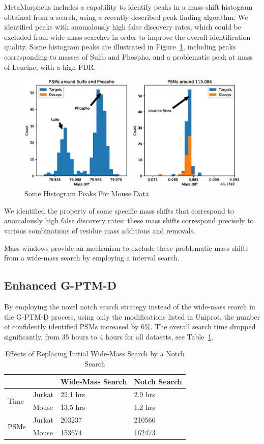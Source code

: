 \documentclass[journal=jprobs,manuscript=article]{achemso}
\begin{document}
MetaMorpheus includes a capability to identify peaks in a mass shift histogram obtained from a search, using a recently described peak finding algorithm\cite{Rodriguez_2014}.
We identified peaks with anomalously high false discovery rates, which could be excluded from wide mass searches in order to improve the overall identification quality.
Some histogram peaks are illustrated in Figure~\ref{fig:figure3}, including peaks corresponding to masses of Sulfo and Phospho, and a problematic peak at mass of Leucine, with a high FDR.

\begin{figure}
\caption{Some Histogram Peaks For Mouse Data}
\label{fig:figure3}
\includegraphics[scale=0.6]{figure_3peaks}
\end{figure}

We identified the property of some specific mass shifts that correspond to anomalously high false discovery rates: these mass shifts correspond precisely to various combinations of residue mass additions and removals.

Mass windows provide an mechanism to exclude these problematic mass shifts from a wide-mass search by employing a interval search.

\subsection{Enhanced G-PTM-D}

By employing the novel notch search strategy instead of the wide-mass search in the G-PTM-D process, using only the modifications listed in Uniprot, the number of confidently identified PSMs increased by 6\%.
The overall search time dropped significantly, from 35 hours to 4 hours for all datasets, see Table~\ref{my-label}.

\begin{table}[]
\centering
\caption{Effects of Replacing Initial Wide-Mass Search by a Notch Search}
\label{my-label}
\begin{tabular}{ll|l|l}
                      &        & Wide-Mass Search & Notch Search\\
\hline
\multirow{2}{*}{Time} & Jurkat & 22.1 hrs         & 2.9 hrs    \\
                      & Mouse  & 13.5 hrs         & 1.2 hrs   \\
\hline
\multirow{2}{*}{PSMs} & Jurkat & 203237           & 210566    \\
                      & Mouse  & 153674           & 162473   
\end{tabular}
\end{table}
\end{document}

